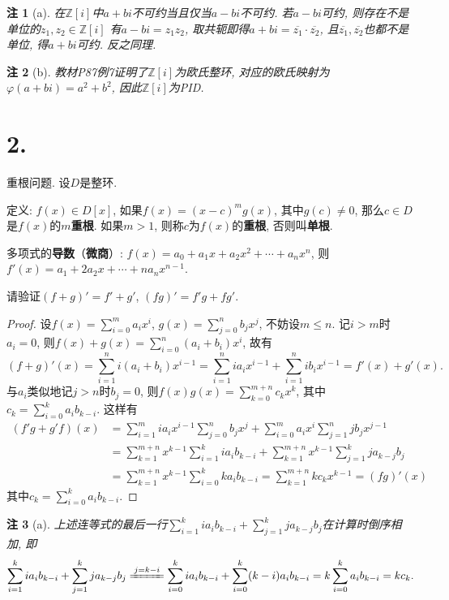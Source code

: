 \documentclass[12pt, a4paper, fontset=windows]{ctexart}
\newcommand{\Z}{\mathbb{Z}}
\newcommand{\cl}[1]{\overline{#1}} %
\newcommand{\kh}[1]{（{#1}）} %
\newtheorem*{remark}{注}
\begin{document}
\begin{remark}[a]
在$\Z[i]$中$a+bi$不可约当且仅当$a-bi$不可约. 
若$a-bi$可约, 则存在不是单位的$z_1,z_2\in\Z[i]$
有$a-bi=z_1z_2$, 取共轭即得$a+bi=\cl{z_1}\cdot\cl{z_2}$, 
且$\cl{z_1},\cl{z_2}$也都不是单位, 得$a+bi$可约. 反之同理. 
\end{remark}

\begin{remark}[b]
教材{\rm P87}例{7\rm\cite{jsds}}证明了$\Z[i]$为欧氏整环, 对应的欧氏映射为
$\varphi(a+bi)=a^2+b^2$, 因此$\Z[i]$为{\rm PID}. 
\end{remark}

\section*{2.}
\label{dbl-rt}

重根问题. 设$D$是整环. 

定义: $f(x)\in D[x]$, 如果$f(x)=(x-c)^mg(x)$, 
其中$g(c)\ne 0$, 那么$c\in D$是$f(x)$的{\bf $m$重根}. 如果$m>1$, 
则称$c$为$f(x)$的{\bf 重根}, 否则叫{\bf 单根}. 

多项式的{\bf 导数}\kh{\bf 微商}: $f(x)=a_0+a_1x+a_2x^2+\cdots+a_nx^n$, 
则$f'(x)=a_1+2a_2x+\cdots+na_nx^{n-1}$. 

请验证$(f+g)'=f'+g'$, $(fg)'=f'g+fg'$. 

\begin{proof}
设$f(x)=\sum^m_{i=0}a_ix^i$, $g(x)=\sum^n_{j=0}b_jx^j$, 
不妨设$m\le n$. 记$i>m$时$a_i=0$, 
则$f(x)+g(x)=\sum^n_{i=0}(a_i+b_i)x^i$, 故有
\[(f+g)'(x)=\sum^n_{i=1}i(a_i+b_i)x^{i-1}=\sum^n_{i=1}ia_ix^{i-1}+\sum^n_{i=1}ib_ix^{i-1}=f'(x)+g'(x). \]
与$a_i$类似地记$j>n$时$b_j=0$, 则$f(x)g(x)=\sum^{m+n}_{k=0}c_kx^k$, 
其中$c_k=\sum^k_{i=0}a_ib_{k-i}$. 这样有
\begin{align*}
(f'g+g'f)(x)&=\sum^m_{i=1}ia_ix^{i-1}\sum^n_{j=0}b_jx^j+\sum^m_{i=0}a_ix^i\sum^n_{j=1}jb_jx^{j-1}\\
&=\sum^{m+n}_{k=1}x^{k-1}\sum^k_{i=1}ia_ib_{k-i}+\sum^{m+n}_{k=1}x^{k-1}\sum^k_{j=1}ja_{k-j}b_j\\
&=\sum^{m+n}_{k=1}x^{k-1}\sum^k_{i=0}ka_ib_{k-i}=\sum^{m+n}_{k=1}kc_kx^{k-1}=(fg)'(x)
\end{align*}
其中$c_k=\sum^k_{i=0}a_ib_{k-i}$. 
\end{proof}

\begin{remark}[a]
上述连等式的最后一行$\sum^k_{i=1}ia_ib_{k-i}+\sum^k_{j=1}ja_{k-j}b_j$在计算时倒序相加, 即
\[\sum^k_{i=1}ia_ib_{k-i}+\sum^k_{j=1}ja_{k-j}b_j\xlongequal{j=k-i}\sum^k_{i=0}ia_ib_{k-i}+\sum^k_{i=0}(k-i)a_ib_{k-i}=k\sum^k_{i=0}a_ib_{k-i}=kc_k. \]
\end{remark}
\end{document}
